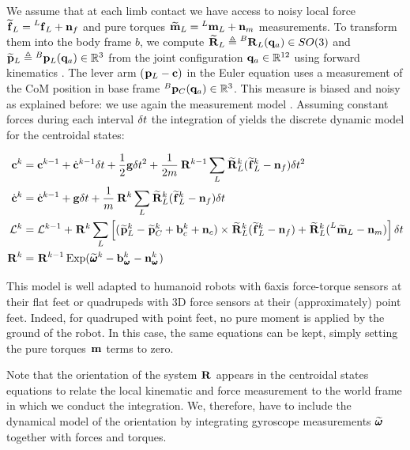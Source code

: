 We assume that at each limb contact we have access to noisy local force $\prescript{}{}{\widetilde{{\bf f}}}_{L} = \prescript{L}{}{{\bf f}}_{L} + {\bf n}_f$ and pure torques 
$\prescript{}{}{\widetilde{\bf m}}_{L} = \prescript{L}{}{\bf m}_{L} + {\bf n}_m$ measurements. 
To transform them into the body frame $b$, we compute $\prescript{}{}{\widetilde{{\bf R}}}_{L} \triangleq \prescript{B}{}{{\bf R}}_{L}({\bf q}_a)  \in SO(3)$ and $\prescript{}{}{\widetilde{{\bf p}}}_{L} \triangleq \prescript{B}{}{{\bf p}}_{L}({\bf q}_a) \in \mathbb{R}^3 $ 
from the joint configuration ${\bf q}_a  \in \mathbb{R}^{12}$ using forward kinematics . 
The lever arm $(\prescript{}{}{{\bf p}}_{L} - {\bf c})$ in the Euler equation  uses a measurement of the CoM position in base frame $ \prescript{B}{}{{\bf p}}_{C}({\bf q}_a) \in \mathbb{R}^3$. 
This measure is biased and noisy as explained before: we use again the measurement model .
Assuming constant forces during each interval $\delta t$ the integration of  yields the discrete dynamic model for the centroidal states:


\begin{equation}
    \begin{split}
        {\bf c}^{k} &= {\bf c}^{k-1} + \dot{{\bf c}}^{k-1} \delta t+\frac{1}{2} {\bf g} \delta t^2 + \frac{1}{2m} \prescript{}{}{{\bf R}}_{}^{k-1} \sum_L \prescript{}{}{\widetilde{{\bf R}}}_{L}^k (\prescript{}{}{\widetilde{{\bf f}}}_{L}^k - {\bf n}_{f}) \delta t^2
        \\
        \dot{{\bf c}}^{k}&= \dot{{\bf c}}^{k-1} + {\bf g} \delta t + \frac{1}{m} \prescript{}{}{{\bf R}}_{}^k \sum_L\prescript{}{}{\widetilde{{\bf R}}}_{L}^k (\prescript{}{}{\widetilde{{\bf f}}}_{L}^k - {\bf n}_{f}) \delta t 
        \\
        \mathcal{L}^{k} &= \mathcal{L}^{k-1} +\prescript{}{}{{\bf R}}_{}^k \sum_L \left[ (\prescript{}{}{\widetilde{{\bf p}}}_{L}^k  - \prescript{}{}{\widetilde{{\bf p}}}_{C}^k +  {\bf b}_{c}^k + {\bf n}_{c}) \times \prescript{}{}{\widetilde{{\bf R}}}_{L}^k(\prescript{}{}{\widetilde{{\bf f}}}_{L}^k - {\bf n}_{f}) 
                                                        + \prescript{}{}{\widetilde{{\bf R}}}_{L}^k(\prescript{L}{}{\widetilde{\bf m}}_{L} - {\bf n}_m)\right]\delta t
        \\
        \prescript{}{}{{\bf R}}_{}^k &= \prescript{}{}{{\bf R}}_{}^{k-1}\operatorname*{Exp}(\prescript{}{}{\widetilde{\pmb{\omega}}}_{}^k - {\bf b}_{\prescript{}{}{\pmb{\omega}}_{}}^k - {\bf n}_{\prescript{}{}{\pmb{\omega}}_{}}^k)
    \end{split}
    \label{eq:COMDiscrete}
\end{equation}

This model is well adapted to humanoid robots with 6axis force-torque sensors at their flat feet or quadrupeds with 3D force sensors at their (approximately) 
point feet. Indeed, for quadruped with point feet, no pure moment is applied by the ground of the robot. In this case, the same equations can be kept, simply setting the
pure torques  $\prescript{}{}{\bf m}_{}$ terms to zero.

Note that the orientation of the system $\prescript{}{}{{\bf R}}_{}$ appears in the centroidal states equations to relate the local kinematic and force measurement to the world frame in
which we conduct the integration. We, therefore, have to include the dynamical model of the orientation by integrating gyroscope measurements $\prescript{}{}{\widetilde{\pmb{\omega}}}_{}$ together with forces and torques. 

